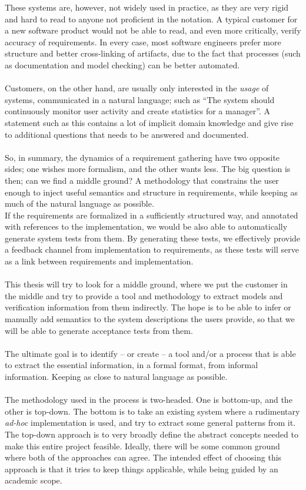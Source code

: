 These systems are, however, not widely used in practice, as they are very rigid and hard to read to anyone not proficient in the notation. A typical customer for a new software product would not be able to read, and even more critically, verify accuracy of requirements. In every case, most software engineers prefer more structure and better cross-linking of artifacts, due to the fact that processes (such as documentation and model checking) can be better automated.\\\\
Customers, on the other hand, are usually only interested in the \emph{usage} of systems, communicated in a natural language; such as ``The system should continuously monitor user activity and create statistics for a manager''. A statement such as this contains a lot of implicit domain knowledge and give rise to additional questions that needs to be answered and documented.\\\\
So, in summary, the dynamics of a requirement gathering have two opposite sides; one wishes more formalism, and the other wants less. The big question is then; can we find a middle ground? A methodology that constrains the user enough to inject useful semantics and structure in requirements, while keeping as much of the natural language as possible.\\
If the requirements are formalized in a sufficiently structured way, and annotated with references to the implementation, we would be also able to automatically generate system tests from them. By generating these tests, we effectively provide a feedback channel from implementation to requirements, as these tests will serve as a link between requirements and implementation.\\\\
This thesis will try to look for a middle ground, where we put the customer in the middle and try to provide a tool and methodology to extract models and verification information from them indirectly. The hope is to be able to infer or manually add semantics to the system descriptions the users provide, so that we will be able to generate acceptance tests from them.\\\\
The ultimate goal is to identify -- or create --  a tool and/or a process that is able to extract the essential information, in a formal format, from informal information. Keeping as close to natural language as possible.\\\\
The methodology used in the process is two-headed. One is bottom-up, and the other is top-down. The bottom is to take an existing system where a rudimentary \emph{ad-hoc} implementation is used, and try to extract some general patterns from it. The top-down approach is to very broadly define the abstract concepts needed to make this entire project feasible. Ideally, there will be some common ground where both of the approaches can agree. The intended effect of choosing this approach is that it tries to keep things applicable, while being guided by an academic scope.

